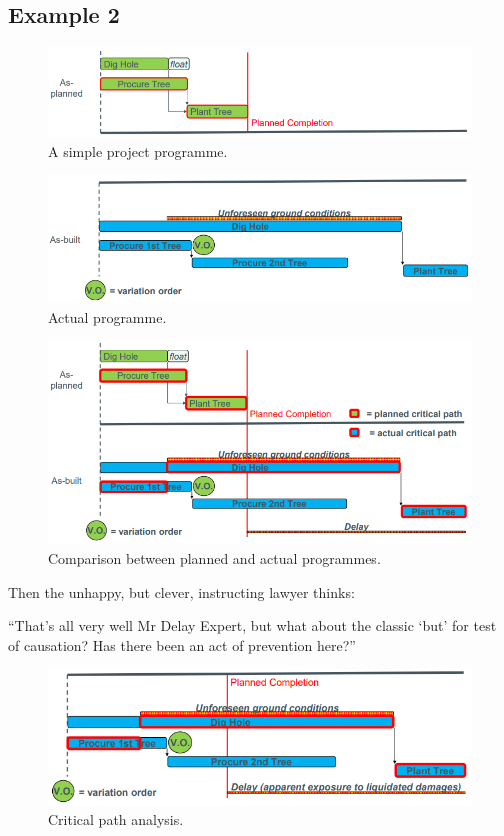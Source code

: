 \subsection{Example 2}
\begin{figure}[H]
    \centering
    \includegraphics[width = \textwidth]{img/figure46.png}
    \caption{A simple project programme.}
\end{figure}
\begin{figure}[H]
    \centering
    \includegraphics[width = \textwidth]{img/figure47.png}
    \caption{Actual programme.}
\end{figure}
\begin{figure}[H]
    \centering
    \includegraphics[width = \textwidth]{img/figure48.png}
    \caption{Comparison between planned and actual programmes.}
\end{figure}
Then the unhappy, but clever, instructing lawyer thinks:
\begin{quoting}
    ``That's all very well Mr Delay Expert, but what about the classic `but' for test of causation? Has there been an act of prevention here?''
\end{quoting}
\begin{figure}[H]
    \centering
    \includegraphics[width = \textwidth]{img/figure49.png}
    \caption{Critical path analysis.}
\end{figure}
